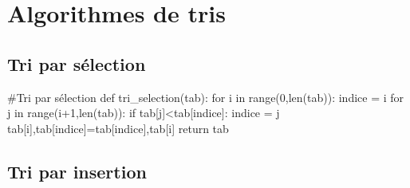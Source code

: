 \documentclass[10pt]{article}
\begin{document}
\section{Algorithmes de tris}%
\subsection{Tri par sélection}
\begin{py}
\begin{python}
#Tri par sélection
def tri_selection(tab):
    for i in range(0,len(tab)):
        indice = i
        for j in range(i+1,len(tab)):
            if tab[j]<tab[indice]:
               indice = j
        tab[i],tab[indice]=tab[indice],tab[i]
    return tab
\end{python}
\end{py}
\subsection{Tri par insertion}
\end{document}
